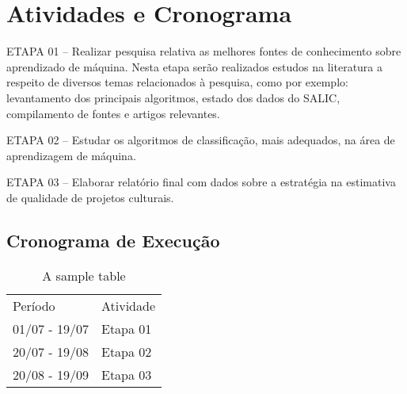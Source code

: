 \chapter[Atividades e Cronograma]{Atividades e Cronograma}


ETAPA 01 – Realizar pesquisa relativa as melhores fontes de conhecimento sobre aprendizado de máquina. Nesta etapa serão
realizados estudos na literatura a respeito de diversos temas relacionados à pesquisa, como por exemplo: levantamento dos
principais algoritmos, estado dos dados do SALIC, compilamento de fontes e artigos relevantes.

ETAPA 02 – Estudar os algoritmos de classificação, mais adequados, na área de aprendizagem de máquina.

ETAPA 03 – Elaborar relatório final com dados sobre a estratégia na estimativa de qualidade de projetos culturais.

\section{Cronograma de Execução}

\begin{table}[h]
 \centering
 {\renewcommand\arraystretch{1.25}
 \caption{A sample table}
 \begin{tabular}{ l l }
  \cline{1-1}\cline{2-2}  
    \multicolumn{1}{|p{3.850cm}|}{Período \centering } &
    \multicolumn{1}{p{4.217cm}|}{Atividade \centering }
  \\  
  \cline{1-1}\cline{2-2}  
    \multicolumn{1}{|p{3.850cm}|}{01/07 - 19/07 \centering } &
    \multicolumn{1}{p{4.217cm}|}{Etapa 01 \centering }
  \\  
  \cline{1-1}\cline{2-2}  
    \multicolumn{1}{|p{3.850cm}|}{20/07 - 19/08 \centering } &
    \multicolumn{1}{p{4.217cm}|}{Etapa 02 \centering }
  \\  
  \cline{1-1}\cline{2-2}  
    \multicolumn{1}{|p{3.850cm}|}{20/08 - 19/09 \centering } &
    \multicolumn{1}{p{4.217cm}|}{Etapa 03 \centering }
  \\  
  \hline

 \end{tabular} }
\end{table}
